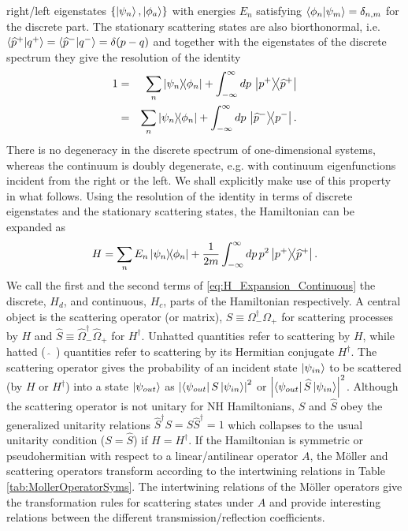 right/left eigenstates $\left\{ \ket{\psi_n} , \ket{\phi_a} \right\}$ with energies $E_n$ satisfying $\braket{\phi_n}{\psi_m} = \delta_{n,m}$ for the discrete part. The stationary scattering states are also biorthonormal, i.e. $\braket{\widehat{p}^+}{q^+} = \braket{\widehat{p}^-}{q^-} = \delta (p-q)$ and together with the eigenstates of the discrete spectrum they give the resolution of the identity
%
\begin{eqnarray}
    1 &=& \sum_{n}\ketbra{\psi_n}{\phi_n} + \int_{-\infty}^{\infty} dp\, \ketbra{p^+}{\widehat{p}^+}
    \nonumber\\
    &=& \sum_{n}\ketbra{\psi_n}{\phi_n} + \int_{-\infty}^{\infty} dp\, \ketbra{\widehat{p}^-}{p^-}.
    \label{eq:identity}
\end{eqnarray}
%
There is no degeneracy in the discrete spectrum of one-dimensional systems, whereas the continuum is doubly degenerate,
e.g. with continuum eigenfunctions incident from the right or the left.  We shall explicitly make use of this property in what follows. Using the resolution of the identity in terms of discrete eigenstates and the stationary scattering states, the Hamiltonian can be expanded as
%
\begin{equation}
    H = \sum_{n}E_n\ketbra{\psi_n}{\phi_n} + \frac{1}{2m}\int_{-\infty}^{\infty} dp\,p^2 \ketbra{p^+}{\widehat{p}^+}.
    \label{eq:H_Expansion_Continuous}
\end{equation}
%
We call the first and the second terms of \eqref{eq:H_Expansion_Continuous} the discrete, $H_d$, and continuous, $H_c$, parts of the Hamiltonian respectively. A central object is the scattering operator (or matrix), $S \equiv \Omega_-^\dagger \Omega_+$ for scattering processes by $H$ and $\widehat{S} \equiv \widehat{\Omega}_-^\dagger \widehat{\Omega}_+$ for $H^\dagger$. Unhatted quantities refer to scattering by $H$, while hatted ( $\widehat{\;}$ ) quantities refer to scattering by its Hermitian conjugate $H^\dagger$. The scattering operator gives the probability of an incident state $\ket{\psi_{in}}$ to be scattered (by $H$ or $H ^\dagger$) into a state $\ket{\psi_{out}}$ as $\left|\bra{\psi_{out}} S \ket{\psi_{in}}\right|^2$ or $\left|\bra{\psi_{out}} \widehat{S} \ket{\psi_{in}}\right|^2$. Although the scattering operator is not unitary for NH Hamiltonians, $S$ and $\widehat{S}$ obey the generalized unitarity relations $\widehat{S}^\dagger S = S\widehat{S}^\dagger= 1$ which collapses to the usual unitarity condition ($S = \widehat{S}$) if $H = H^\dagger$. If the Hamiltonian is symmetric or pseudohermitian with respect to a linear/antilinear operator $A$, the M\"oller and scattering operators transform according to the intertwining relations in Table \ref{tab:MollerOperatorSyms}. The intertwining relations of the M\"oller operators give the transformation rules for scattering states under $A$ and provide interesting relations between the different transmission/reflection coefficients.

